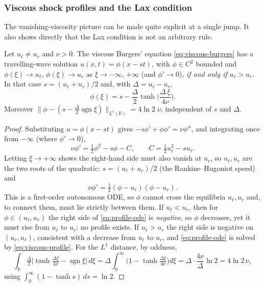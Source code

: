 \subsubsection{Viscous shock profiles and the Lax condition}
\label{subsubsec:viscous-profiles}

The vanishing-viscosity picture can be made quite explicit at a single jump.
It also shows directly that the Lax condition is not an arbitrary rule.

\begin{proposition}
\label{prop:viscous-profile}
Let $u_\ell\neq u_r$ and $\nu>0$. The viscous Burgers' equation
\eqref{eq:viscous-burgers} has a travelling-wave solution $u(x,t)=\phi(x-st)$,
with $\phi\in C^2$ bounded and $\phi(\xi)\to u_\ell$, $\phi(\xi)\to u_r$ as
$\xi\to-\infty$, $+\infty$ (and $\phi'\to0$), \emph{if and only if}
$u_\ell>u_r$. In that case $s=(u_\ell+u_r)/2$ and, with $\Delta=u_\ell-u_r$,
\begin{equation}
  \label{eq:viscous-profile}
  \phi(\xi)=s-\frac{\Delta}{2}\tanh\!\Big(\frac{\Delta\,\xi}{4\nu}\Big).
\end{equation}
Moreover $\|\phi-(s-\tfrac\Delta2\operatorname{sgn}\xi)\|_{L^1(\mathbb{R})}
=4\ln2\;\nu$, independent of $s$ and $\Delta$.
\end{proposition}

\begin{proof}
Substituting $u=\phi(x-st)$ gives $-s\phi'+\phi\phi'=\nu\phi''$, and
integrating once from $-\infty$ (where $\phi'\to0$),
\begin{equation*}
  \nu\phi'=\tfrac12\phi^2-s\phi-C,\qquad C=\tfrac12u_\ell^2-su_\ell .
\end{equation*}
Letting $\xi\to+\infty$ shows the right-hand side must also vanish at $u_r$,
so $u_\ell,u_r$ are the two roots of the quadratic: $s=(u_\ell+u_r)/2$
(the Rankine--Hugoniot speed) and
\begin{equation}
  \label{eq:profile-ode}
  \nu\phi'=\tfrac12(\phi-u_\ell)(\phi-u_r).
\end{equation}
This is a first-order autonomous ODE, so $\phi$ cannot cross the equilibria
$u_\ell,u_r$ and, to connect them, must lie strictly between them. If
$u_\ell<u_r$, then for $\phi\in(u_\ell,u_r)$ the right side of
\eqref{eq:profile-ode} is \emph{negative}, so $\phi$ decreases, yet it must
rise from $u_\ell$ to $u_r$: no profile exists. If $u_\ell>u_r$ the right side
is negative on $(u_r,u_\ell)$, consistent with a decrease from $u_\ell$ to
$u_r$, and \eqref{eq:profile-ode} is solved by \eqref{eq:viscous-profile}.
For the $L^1$ distance, by oddness,
\begin{equation*}
  \int_{\mathbb{R}}\tfrac\Delta2\Big|\tanh\tfrac{\Delta\xi}{4\nu}-\operatorname{sgn}\xi\Big|\,d\xi
  =\Delta\int_0^\infty\Big(1-\tanh\tfrac{\Delta\xi}{4\nu}\Big)d\xi
  =\Delta\cdot\frac{4\nu}{\Delta}\ln2=4\ln2\,\nu,
\end{equation*}
using $\int_0^\infty(1-\tanh s)\,ds=\ln2$.
\end{proof}

